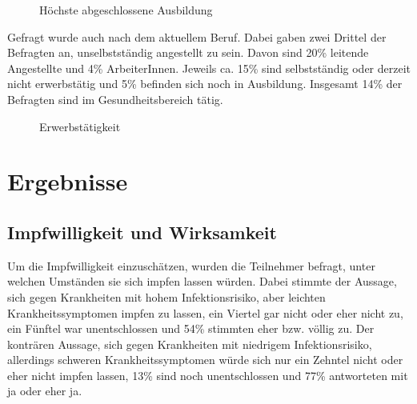 \begin{figure}[hp]
    \centering
\caption{Höchste abgeschlossene Ausbildung}
\end{figure}

Gefragt wurde auch nach dem aktuellem Beruf. Dabei gaben zwei Drittel der Befragten an, unselbstständig angestellt zu sein. Davon sind 20\% leitende Angestellte und 4\% ArbeiterInnen. Jeweils ca. 15\% sind selbstständig oder derzeit nicht erwerbstätig und 5\% befinden sich noch in Ausbildung. Insgesamt 14\% der Befragten sind im Gesundheitsbereich tätig.

\begin{figure}[hp]
    \centering
\caption{Erwerbstätigkeit}
\end{figure}

\section{Ergebnisse}

\subsection{Impfwilligkeit und Wirksamkeit}

Um die Impfwilligkeit einzuschätzen, wurden die Teilnehmer befragt, unter welchen Umständen sie sich impfen lassen würden. Dabei stimmte der Aussage, sich gegen Krankheiten mit hohem Infektionsrisiko, aber leichten Krankheitssymptomen impfen zu lassen, ein Viertel gar nicht oder eher nicht zu, ein Fünftel war unentschlossen und 54\% stimmten eher bzw. völlig zu. Der konträren Aussage, sich gegen Krankheiten mit niedrigem Infektionsrisiko, allerdings schweren Krankheitssymptomen würde sich nur ein Zehntel nicht oder eher nicht impfen lassen, 13\% sind noch unentschlossen und 77\% antworteten mit ja oder eher ja.

